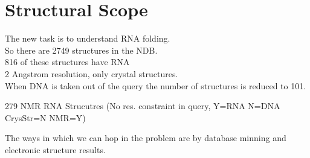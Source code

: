 
\part{Structural Scope}

The  new  task is  to  understand RNA  folding.\\  
So  there are  2749 structures in the NDB.\\
816 of these structures have RNA\\
2 Angstrom resolution, only crystal structures.\\
When DNA is taken out of the query the number of structures is reduced
to 101.

279 NMR RNA Strucutres (No res. constraint in query, Y=RNA N=DNA CrysStr=N NMR=Y)

The ways  in which we can hop  in the problem are  by database minning
and electronic structure results.

